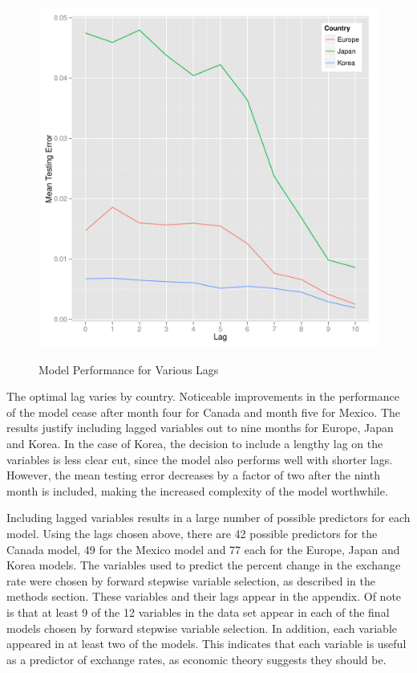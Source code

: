 \documentclass{sig-alternate-05-2015}
\begin{document}
\begin{figure}
\centering
\caption{Model Performance for Various Lags}
\includegraphics[scale=0.45]{lag2.pdf}
\label{fig:lag2}
\end{figure}

\par{} The optimal lag varies by country. Noticeable improvements in the performance of the model cease after month four for Canada and month five for Mexico. The results justify including lagged variables out to nine months for Europe, Japan and Korea. In the case of Korea, the decision to include a lengthy lag on the variables is less clear cut, since the model also performs well with shorter lags. However, the mean testing error decreases by a factor of two after the ninth month is included, making the increased complexity of the model worthwhile.
\par{} Including lagged variables results in a large number of possible predictors for each model. Using the lags chosen above, there are 42 possible predictors for the Canada model, 49 for the Mexico model and 77 each for the Europe, Japan and Korea models. The variables used to predict the percent change in the exchange rate were chosen by forward stepwise variable selection, as described in the methods section. These variables and their lags appear in the appendix. Of note is that at least 9 of the 12 variables in the data set appear in each of the final models chosen by forward stepwise variable selection. In addition, each variable appeared in at least two of the models. This indicates that each variable is useful as a predictor of exchange rates, as economic theory suggests they should be.
\end{document}
